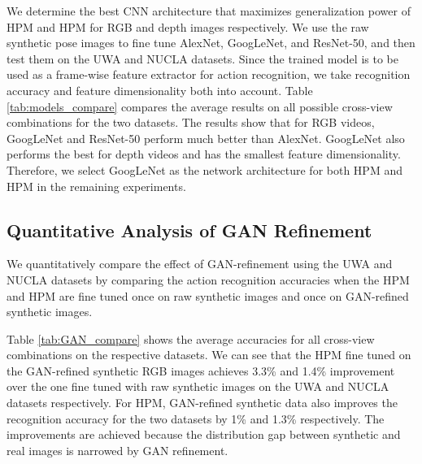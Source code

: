 \documentclass[twocolumn]{svjour3}          \smartqed  \usepackage{graphicx}
\begin{document}
We determine the best CNN architecture that maximizes generalization power of HPM and HPM for RGB and depth images respectively. We use the raw synthetic pose images to fine tune AlexNet, GoogLeNet, and ResNet-50, and then test them on the UWA and NUCLA datasets. Since the trained model is to be used as a frame-wise feature extractor for action recognition, we take recognition accuracy and feature dimensionality both into account. Table \ref{tab:models_compare} compares the average results on all possible cross-view combinations for the two datasets. The results show that for RGB videos, GoogLeNet and ResNet-50 perform much better than AlexNet. GoogLeNet also performs the best for depth videos and has the smallest feature dimensionality.  Therefore, we select GoogLeNet as the network architecture for both HPM and HPM in the remaining experiments.


\subsection{Quantitative Analysis of GAN Refinement}

We quantitatively compare the effect of GAN-refinement using the UWA and NUCLA datasets by comparing the action recognition accuracies when the HPM and HPM are fine tuned once on raw synthetic images and once on GAN-refined synthetic images. 

Table \ref{tab:GAN_compare} shows the average accuracies for all cross-view combinations on the respective datasets. We can see that the HPM fine tuned on the GAN-refined synthetic RGB images achieves 3.3\% and 1.4\% improvement over the one fine tuned with raw synthetic images on the UWA and NUCLA datasets respectively. For HPM, GAN-refined synthetic data also improves the recognition accuracy for the two datasets by 1\% and 1.3\% respectively. The improvements are achieved because the distribution gap between synthetic and real images is narrowed by GAN refinement. 
\end{document}
